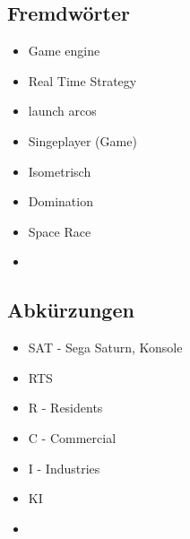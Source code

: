 \subsection*{Fremdwörter}
\begin{itemize}
    \item Game engine
    \item Real Time Strategy
    \item launch arcos
    \item Singeplayer (Game)
    \item Isometrisch
    \item Domination
    \item Space Race
    \item 
\end{itemize}

\subsection*{Abkürzungen}
\begin{itemize}
    \item SAT - Sega Saturn, Konsole
    \item RTS
    \item R - Residents
    \item C - Commercial
    \item I - Industries
    \item KI
    \item 
\end{itemize}
